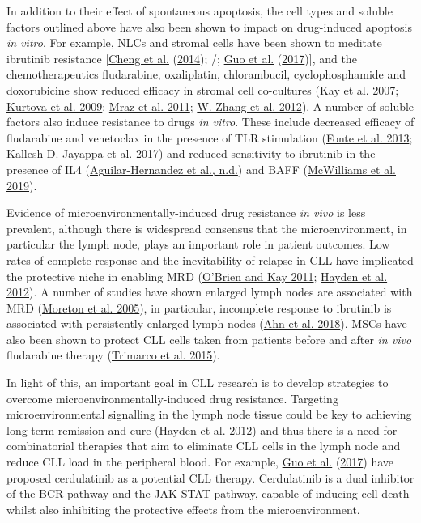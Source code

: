 \documentclass[11pt, a4paper, twosided]{book}
\begin{document}
In addition to their effect of spontaneous apoptosis, the cell types and soluble factors outlined above have also been shown to impact on drug-induced apoptosis \emph{in vitro}. For example, NLCs and stromal cells have been shown to meditate ibrutinib resistance {[}\protect\hyperlink{ref-Cheng2014}{Cheng et al.} (\protect\hyperlink{ref-Cheng2014}{2014}); /; \protect\hyperlink{ref-Guo2017}{Guo et al.} (\protect\hyperlink{ref-Guo2017}{2017}){]}, and the chemotherapeutics fludarabine, oxaliplatin, chlorambucil, cyclophosphamide and doxorubicine show reduced efficacy in stromal cell co-cultures (\protect\hyperlink{ref-Kay2007}{Kay et al. 2007}; \protect\hyperlink{ref-Kurtova2009}{Kurtova et al. 2009}; \protect\hyperlink{ref-Mraz2011}{Mraz et al. 2011}; \protect\hyperlink{ref-Zhang2012}{W. Zhang et al. 2012}). A number of soluble factors also induce resistance to drugs \emph{in vitro}. These include decreased efficacy of fludarabine and venetoclax in the presence of TLR stimulation (\protect\hyperlink{ref-Fonte2013}{Fonte et al. 2013}; \protect\hyperlink{ref-Jayappa2017}{Kallesh D. Jayappa et al. 2017}) and reduced sensitivity to ibrutinib in the presence of IL4 (\protect\hyperlink{ref-AguilarHernandez2016}{Aguilar-Hernandez et al., n.d.}) and BAFF (\protect\hyperlink{ref-McWilliams2019}{McWilliams et al. 2019}).

Evidence of microenvironmentally-induced drug resistance \emph{in vivo} is less prevalent, although there is widespread consensus that the microenvironment, in particular the lymph node, plays an important role in patient outcomes. Low rates of complete response and the inevitability of relapse in CLL have implicated the protective niche in enabling MRD (\protect\hyperlink{ref-OBrien2011}{O'Brien and Kay 2011}; \protect\hyperlink{ref-Hayden2012}{Hayden et al. 2012}). A number of studies have shown enlarged lymph nodes are associated with MRD (\protect\hyperlink{ref-Moreton2005}{Moreton et al. 2005}), in particular, incomplete response to ibrutinib is associated with persistently enlarged lymph nodes (\protect\hyperlink{ref-Ahn2018}{Ahn et al. 2018}). MSCs have also been shown to protect CLL cells taken from patients before and after \emph{in vivo} fludarabine therapy (\protect\hyperlink{ref-Trimarco2015}{Trimarco et al. 2015}).

In light of this, an important goal in CLL research is to develop strategies to overcome microenvironmentally-induced drug resistance. Targeting microenvironmental signalling in the lymph node tissue could be key to achieving long term remission and cure (\protect\hyperlink{ref-Hayden2012}{Hayden et al. 2012}) and thus there is a need for combinatorial therapies that aim to eliminate CLL cells in the lymph node and reduce CLL load in the peripheral blood. For example, \protect\hyperlink{ref-Guo2017}{Guo et al.} (\protect\hyperlink{ref-Guo2017}{2017}) have proposed cerdulatinib as a potential CLL therapy. Cerdulatinib is a dual inhibitor of the BCR pathway and the JAK-STAT pathway, capable of inducing cell death whilst also inhibiting the protective effects from the microenvironment.
\end{document}
